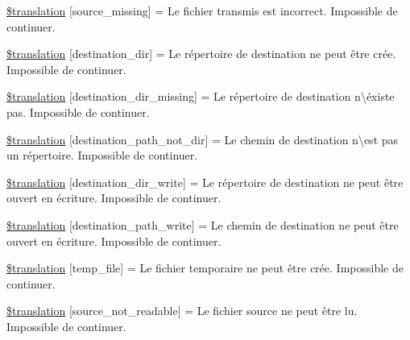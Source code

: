 \begin{DoxyCompactItemize}
\item 
\hyperlink{class_8upload_8fr___f_r_8php_aceaaf7355acaaf10f0ae60378d03c468}{\$translation} \mbox{[}\textquotesingle{}source\+\_\+missing\textquotesingle{}\mbox{]} = \textquotesingle{}Le fichier transmis est incorrect. Impossible de continuer.\textquotesingle{}
\item 
\hyperlink{class_8upload_8fr___f_r_8php_aff2427c72a2598aefa6d58df1dd18b08}{\$translation} \mbox{[}\textquotesingle{}destination\+\_\+dir\textquotesingle{}\mbox{]} = \textquotesingle{}Le répertoire de destination ne peut être crée. Impossible de continuer.\textquotesingle{}
\item 
\hyperlink{class_8upload_8fr___f_r_8php_a9ef28d3cf09942c6c0a1e77fa09185e8}{\$translation} \mbox{[}\textquotesingle{}destination\+\_\+dir\+\_\+missing\textquotesingle{}\mbox{]} = \textquotesingle{}Le répertoire de destination n\textbackslash{}\textquotesingle{}éxiste pas. Impossible de continuer.\textquotesingle{}
\item 
\hyperlink{class_8upload_8fr___f_r_8php_a5704a67137126e8c87b7a364175929d4}{\$translation} \mbox{[}\textquotesingle{}destination\+\_\+path\+\_\+not\+\_\+dir\textquotesingle{}\mbox{]} = \textquotesingle{}Le chemin de destination n\textbackslash{}\textquotesingle{}est pas un répertoire. Impossible de continuer.\textquotesingle{}
\item 
\hyperlink{class_8upload_8fr___f_r_8php_a97608ea194a616db49141a0e6dee900c}{\$translation} \mbox{[}\textquotesingle{}destination\+\_\+dir\+\_\+write\textquotesingle{}\mbox{]} = \textquotesingle{}Le répertoire de destination ne peut être ouvert en écriture. Impossible de continuer.\textquotesingle{}
\item 
\hyperlink{class_8upload_8fr___f_r_8php_a40e4e1962226b89fd76da5819a9602b0}{\$translation} \mbox{[}\textquotesingle{}destination\+\_\+path\+\_\+write\textquotesingle{}\mbox{]} = \textquotesingle{}Le chemin de destination ne peut être ouvert en écriture. Impossible de continuer.\textquotesingle{}
\item 
\hyperlink{class_8upload_8fr___f_r_8php_a2baece8da11e20d45175db91851ec3e3}{\$translation} \mbox{[}\textquotesingle{}temp\+\_\+file\textquotesingle{}\mbox{]} = \textquotesingle{}Le fichier temporaire ne peut être crée. Impossible de continuer.\textquotesingle{}
\item 
\hyperlink{class_8upload_8fr___f_r_8php_a922967ca2df0efdd455261142d8e5715}{\$translation} \mbox{[}\textquotesingle{}source\+\_\+not\+\_\+readable\textquotesingle{}\mbox{]} = \textquotesingle{}Le fichier source ne peut être lu. Impossible de continuer.\textquotesingle{}

\end{DoxyCompactItemize}
